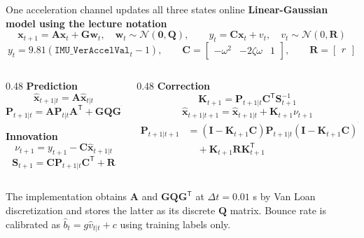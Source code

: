 \documentclass[aspectratio=169,11pt]{beamer}
\begin{document}
\begin{frame}{One acceleration channel updates all three states online}
  \small
  \textbf{Linear-Gaussian model using the lecture notation}
  \[
    \mathbf x_{t+1}=\mathbf A\mathbf x_t+\mathbf G\mathbf w_t,
    \quad \mathbf w_t\sim\mathcal N(\mathbf 0,\mathbf Q),
    \qquad y_t=\mathbf C\mathbf x_t+v_t,
    \quad v_t\sim\mathcal N(0,\mathbf R)
  \]
  \[
    y_t=9.81(\texttt{IMU\_VerAccelVal}_t-1),\qquad
    \mathbf C=\begin{bmatrix}-\omega^2&-2\zeta\omega&1\end{bmatrix},
    \qquad \mathbf R=\begin{bmatrix}r\end{bmatrix}
  \]

  \begin{columns}[T,onlytextwidth]
    \begin{column}{0.48\textwidth}
      \textbf{Prediction}
      \[
        \hat{\mathbf x}_{t+1|t}=\mathbf A\hat{\mathbf x}_{t|t}
      \]
      \[
        \mathbf P_{t+1|t}=\mathbf A\mathbf P_{t|t}\mathbf A^{\mathsf T}
        +\mathbf G\mathbf Q\mathbf G^{\mathsf T}
      \]

      \textbf{Innovation}
      \[
        \nu_{t+1}=y_{t+1}-\mathbf C\hat{\mathbf x}_{t+1|t}
      \]
      \[
        \mathbf S_{t+1}=\mathbf C\mathbf P_{t+1|t}\mathbf C^{\mathsf T}+\mathbf R
      \]
    \end{column}
    \begin{column}{0.48\textwidth}
      \textbf{Correction}
      \[
        \mathbf K_{t+1}=\mathbf P_{t+1|t}\mathbf C^{\mathsf T}\mathbf S_{t+1}^{-1}
      \]
      \[
        \hat{\mathbf x}_{t+1|t+1}=\hat{\mathbf x}_{t+1|t}
        +\mathbf K_{t+1}\nu_{t+1}
      \]
      \footnotesize
      \[
        \begin{aligned}
        \mathbf P_{t+1|t+1}
          &=(\mathbf I-\mathbf K_{t+1}\mathbf C)\mathbf P_{t+1|t}
            (\mathbf I-\mathbf K_{t+1}\mathbf C)^{\mathsf T}\\
          &\quad+\mathbf K_{t+1}\mathbf R\mathbf K_{t+1}^{\mathsf T}
        \end{aligned}
      \]
    \end{column}
  \end{columns}

  \vspace{0.05cm}
  \centering
  \footnotesize
  The implementation obtains $\mathbf A$ and $\mathbf G\mathbf Q\mathbf G^{\mathsf T}$ at $\Delta t=0.01$ s
  by Van Loan discretization and stores the latter as its discrete $\mathbf Q$ matrix.
  Bounce rate is calibrated as $\hat b_t=g\hat v_{t|t}+c$ using training labels only.
\end{frame}
\end{document}
